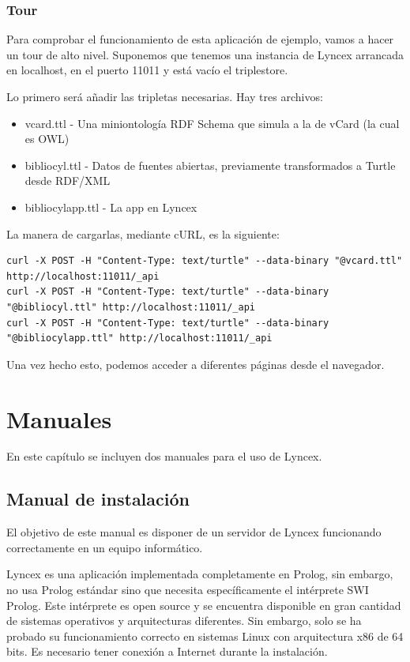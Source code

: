 \documentclass[12pt]{report} %
\begin{document}
\begin{itemize}
\subsection{Tour}

Para comprobar el funcionamiento de esta aplicación de ejemplo, vamos a hacer un tour de alto nivel. Suponemos que tenemos una instancia de Lyncex arrancada en localhost, en el puerto 11011 y está vacío el triplestore.

Lo primero será añadir las tripletas necesarias. Hay tres archivos:
\begin{itemize}
    \item vcard.ttl - Una miniontología RDF Schema que simula a la de vCard (la cual es OWL)
    \item bibliocyl.ttl - Datos de fuentes abiertas, previamente transformados a Turtle desde RDF/XML
    \item bibliocylapp.ttl - La app en Lyncex
\end{itemize}

La manera de cargarlas, mediante cURL, es la siguiente:
\begin{verbatim}
curl -X POST -H "Content-Type: text/turtle" --data-binary "@vcard.ttl" http://localhost:11011/_api
curl -X POST -H "Content-Type: text/turtle" --data-binary "@bibliocyl.ttl" http://localhost:11011/_api
curl -X POST -H "Content-Type: text/turtle" --data-binary "@bibliocylapp.ttl" http://localhost:11011/_api
\end{verbatim}

Una vez hecho esto, podemos acceder a diferentes páginas desde el navegador.

\chapter{Manuales}

En este capítulo se incluyen dos manuales para el uso de Lyncex.

\section{Manual de instalación}

El objetivo de este manual es disponer de un servidor de Lyncex funcionando correctamente en un equipo informático.

Lyncex es una aplicación implementada completamente en Prolog, sin embargo, no usa Prolog estándar sino que necesita específicamente el intérprete SWI Prolog. Este intérprete es open source y se encuentra disponible en gran cantidad de sistemas operativos y arquitecturas diferentes. Sin embargo, solo se ha probado su funcionamiento correcto en sistemas Linux con arquitectura x86 de 64 bits. Es necesario tener conexión a Internet durante la instalación.


\end{itemize}
\end{document}
